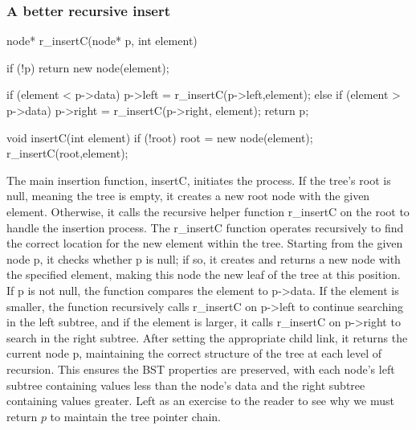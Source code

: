 \documentclass{report}
\begin{document}
\pagebreak 
\subsubsection{A better recursive insert}
\bigbreak \noindent 
\begin{cppcode}
    node* r_insertC(node* p, int element) {
        if (!p) return new node(element);

        if (element < p->data) {
            p->left =  r_insertC(p->left,element);
        } else if (element > p->data) {
            p->right =  r_insertC(p->right, element);
        }
        return p;
    }

    void insertC(int element) {
        if (!root) root = new node(element);
        r_insertC(root,element);
    }
\end{cppcode}
\bigbreak \noindent 
The main insertion function, insertC, initiates the process. If the tree’s root is null, meaning the tree is empty, it creates a new root node with the given element. Otherwise, it calls the recursive helper function r\_insertC on the root to handle the insertion process.
\bigbreak \noindent 
The r\_insertC function operates recursively to find the correct location for the new element within the tree. Starting from the given node p, it checks whether p is null; if so, it creates and returns a new node with the specified element, making this node the new leaf of the tree at this position. If p is not null, the function compares the element to p->data. If the element is smaller, the function recursively calls r\_insertC on p->left to continue searching in the left subtree, and if the element is larger, it calls r\_insertC on p->right to search in the right subtree. After setting the appropriate child link, it returns the current node p, maintaining the correct structure of the tree at each level of recursion. This ensures the BST properties are preserved, with each node’s left subtree containing values less than the node’s data and the right subtree containing values greater.
\bigbreak \noindent 
Left as an exercise to the reader to see why we must return $p$ to maintain the tree pointer chain.

\pagebreak 
\end{document}

